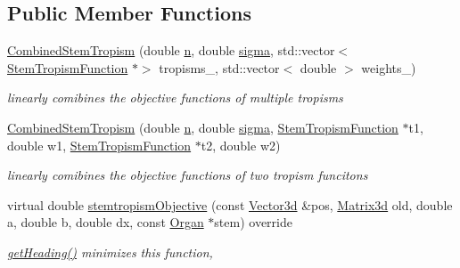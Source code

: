 \subsection*{Public Member Functions}
\begin{DoxyCompactItemize}
\item 
\mbox{\label{classCPlantBox_1_1CombinedStemTropism_a5098b097bfa24475628bafaf7d3f2df8}} 
\hyperlink{classCPlantBox_1_1CombinedStemTropism_a5098b097bfa24475628bafaf7d3f2df8}{Combined\+Stem\+Tropism} (double \hyperlink{classCPlantBox_1_1StemTropismFunction_a54ebffbb66feb026ce61d57f17d4d25a}{n}, double \hyperlink{classCPlantBox_1_1StemTropismFunction_a79ea448c44b07fb59d85e9d130190994}{sigma}, std\+::vector$<$ \hyperlink{classCPlantBox_1_1StemTropismFunction}{Stem\+Tropism\+Function} $\ast$$>$ tropisms\+\_\+, std\+::vector$<$ double $>$ weights\+\_\+)
\begin{DoxyCompactList}\small\item\em linearly comibines the objective functions of multiple tropisms \end{DoxyCompactList}\item 
\hyperlink{classCPlantBox_1_1CombinedStemTropism_ae3d20067c6cd334b68daa7c6608a6f76}{Combined\+Stem\+Tropism} (double \hyperlink{classCPlantBox_1_1StemTropismFunction_a54ebffbb66feb026ce61d57f17d4d25a}{n}, double \hyperlink{classCPlantBox_1_1StemTropismFunction_a79ea448c44b07fb59d85e9d130190994}{sigma}, \hyperlink{classCPlantBox_1_1StemTropismFunction}{Stem\+Tropism\+Function} $\ast$t1, double w1, \hyperlink{classCPlantBox_1_1StemTropismFunction}{Stem\+Tropism\+Function} $\ast$t2, double w2)
\begin{DoxyCompactList}\small\item\em linearly comibines the objective functions of two tropism funcitons \end{DoxyCompactList}\item 
virtual double \hyperlink{classCPlantBox_1_1CombinedStemTropism_abe3aa8ad9529b57d002e7c6407c575c2}{stemtropism\+Objective} (const \hyperlink{classCPlantBox_1_1Vector3d}{Vector3d} \&pos, \hyperlink{classCPlantBox_1_1Matrix3d}{Matrix3d} old, double a, double b, double dx, const \hyperlink{classCPlantBox_1_1Organ}{Organ} $\ast$stem) override
\begin{DoxyCompactList}\small\item\em \hyperlink{classCPlantBox_1_1StemTropismFunction_ac72f7ad1200d1defbb3c9b20e20d1f62}{get\+Heading()} minimizes this function, \end{DoxyCompactList}\end{DoxyCompactItemize}
